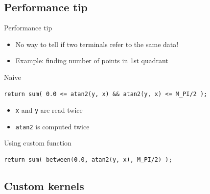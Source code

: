 \documentclass[@BEAMER_OPTIONS@]{beamer}
\newcommand{\code}[1]{\lstinline|#1|}
\begin{document}
\subsection{Performance tip}

\begin{frame}[fragile]{Performance tip}
    \begin{itemize}
        \item No way to tell if two terminals refer to the same data!
        \item Example: finding number of points in 1st quadrant
    \end{itemize}
    \begin{exampleblock}{Naive}
        \begin{lstlisting}
return sum( 0.0 <= atan2(y, x) && atan2(y, x) <= M_PI/2 );
        \end{lstlisting}
    \end{exampleblock}
    \begin{itemize}
        \item<alert@1> \code{x} and \code{y} are read twice
        \item<alert@1> \code{atan2} is computed twice
    \end{itemize}
    \begin{exampleblock}{Using custom function}
        \begin{lstlisting}
return sum( between(0.0, atan2(y, x), M_PI/2) );
        \end{lstlisting}
    \end{exampleblock}
\end{frame}


\subsection{Custom kernels}
\end{document}

